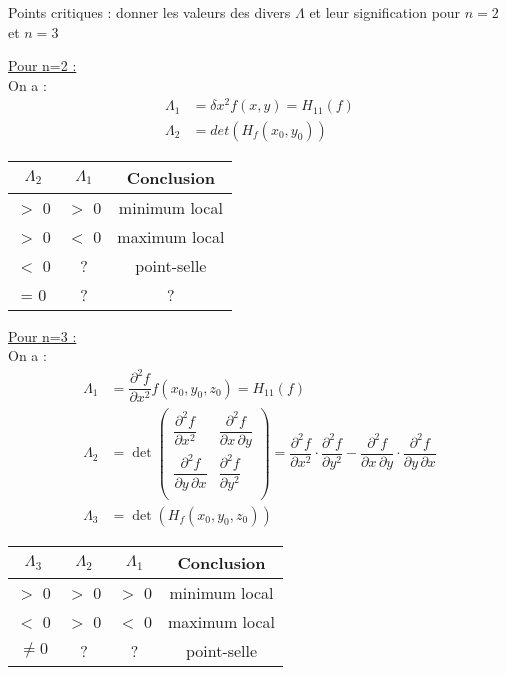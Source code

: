 \documentclass[12pt]{article}
\newcommand*{\xfield}[1]{\begin{mdframed}\centering #1\end{mdframed}\bigskip}
\newenvironment{note}{}{}
\begin{document}
\begin{note}
\xfield{Points critiques : donner les valeurs des divers $\Lambda$ et leur signification pour $n=2$ et $n=3$}
\xfield{\underline{Pour n=2 :}\\
On a :
\begin{align*}
\Lambda_1 &= \delta x^2 f(x,y)  = H_{11}(f)\\
\Lambda_2 &= det(H_f(x_0,y_0)) 
\end{align*}
\begin{center}
\begin{tabular}{c|c|c}
$\Lambda_2$ & $\Lambda_1$ & Conclusion \\ 
\hline
$>$ 0 & $>$ 0 & minimum local \\ 
$>$ 0 & $<$ 0 & maximum local \\ 
$<$ 0 & ? & point-selle \\ 
= 0 & ? & ? \\ 
\end{tabular} 
\end{center}
\underline{Pour n=3 :}\\
On a :
\begin{align*}
\Lambda_1 &= \dfrac{\partial^2 f}{\partial x^2} f(x_0,y_0,z_0)  = H_{11}(f)\\
\Lambda_2 &= \det\begin{pmatrix}
  \dfrac{\partial^2 f}{\partial x^2} & \dfrac{\partial^2 f}{\partial x\,\partial y}\\
  \dfrac{\partial^2 f}{\partial y\,\partial x} & \dfrac{\partial^2 f}{\partial y^2} \\[2.2ex]
\end{pmatrix} = \dfrac{\partial^2 f}{\partial x^2} \cdot \dfrac{\partial^2 f}{\partial y^2} - \dfrac{\partial^2 f}{\partial x\,\partial y} \cdot \dfrac{\partial^2 f}{\partial y\,\partial x}\\
\Lambda_3 &= \det(H_f(x_0,y_0,z_0)) 
\end{align*}
\begin{center}
\begin{tabular}{c|c|c|c}
$\Lambda_3$ & $\Lambda_2$ & $\Lambda_1$ & Conclusion \\ 
\hline
$>$ 0& $>$ 0 & $>$ 0 & minimum local \\ 
$<$ 0 & $>$ 0 & $<$ 0 & maximum local \\ 
$\neq 0$ & ? & ? & point-selle \\ 
\end{tabular} 
\end{center}}
\end{note}
\end{document}
